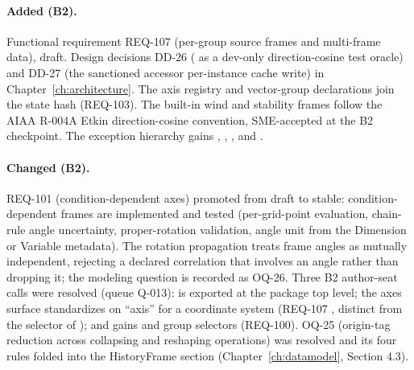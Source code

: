 \paragraph{Added (B2).} Functional requirement REQ-107 (per-group
source frames and multi-frame data), draft. Design decisions DD-26
( as a dev-only direction-cosine test oracle) and DD-27
(the sanctioned accessor per-instance cache write) in
Chapter~\ref{ch:architecture}. The axis registry and vector-group
declarations join the state hash (REQ-103). The built-in wind and
stability frames follow the AIAA R-004A Etkin direction-cosine
convention, SME-accepted at the B2 checkpoint. The exception
hierarchy gains , ,
, and .

\paragraph{Changed (B2).} REQ-101 (condition-dependent axes) promoted
from draft to stable: condition-dependent frames are implemented and
tested (per-grid-point evaluation, chain-rule angle uncertainty,
proper-rotation validation, angle unit from the Dimension or Variable
metadata). The rotation propagation treats frame angles as mutually
independent, rejecting a declared correlation that involves an angle
rather than dropping it; the modeling question is recorded as OQ-26.
Three B2 author-seat calls were resolved (queue Q-013): 
is exported at the package top level; the axes surface standardizes on
``axis'' for a coordinate system (REQ-107 ,
distinct from the  selector of ); and
 gains  and  group
selectors (REQ-100). OQ-25 (origin-tag reduction across collapsing and
reshaping operations) was resolved and its four rules folded into the
HistoryFrame section (Chapter~\ref{ch:datamodel}, Section 4.3).

